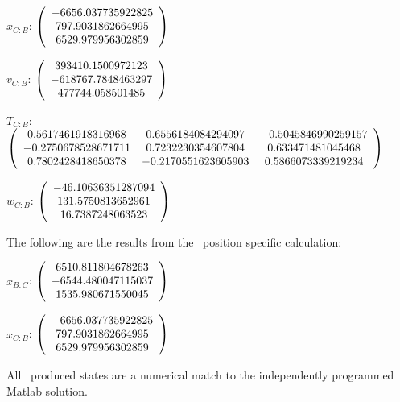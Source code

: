 \begin{description}
$x_{C:B}$: $\left( \begin{array} {ccc}  -6656.037735922825 \\     797.9031862664995 \\     6529.979956302859
\end{array} \right)\\ \\$

$v_{C:B}$:  $\left( \begin{array} {ccc}  393410.1500972123 \\    -618767.7848463297 \\      477744.058501485
\end{array} \right)\\ \\$

$T_{C:B}$: $\left( \begin{array} {ccc}
 0.5617461918316968 &    0.6556184084294097 &   -0.5045846990259157 \\
  -0.2750678528671711 &    0.7232230354607804 &     0.633471481045468 \\
  0.7802428418650378 &   -0.2170551623605903 &    0.5866073339219234 \\
\end{array} \right)\\ \\$

$w_{C:B}$:  $\left( \begin{array} {ccc} -46.10636351287094 \\     131.5750813652961 \\      16.7387248063523
\end{array} \right)\\ \\$


The following are the results from the \ position specific calculation:

$x_{B:C}$: $\left( \begin{array} {ccc} 6510.811804678263 \\    -6544.480047115037 \\     1535.980671550045
\end{array} \right)\\ \\$

$x_{C:B}$: $\left( \begin{array} {ccc}  -6656.037735922825 \\     797.9031862664995 \\     6529.979956302859
\end{array} \right)\\ \\$

All \ produced states are a numerical match to the independently programmed Matlab solution.

\end{description}


